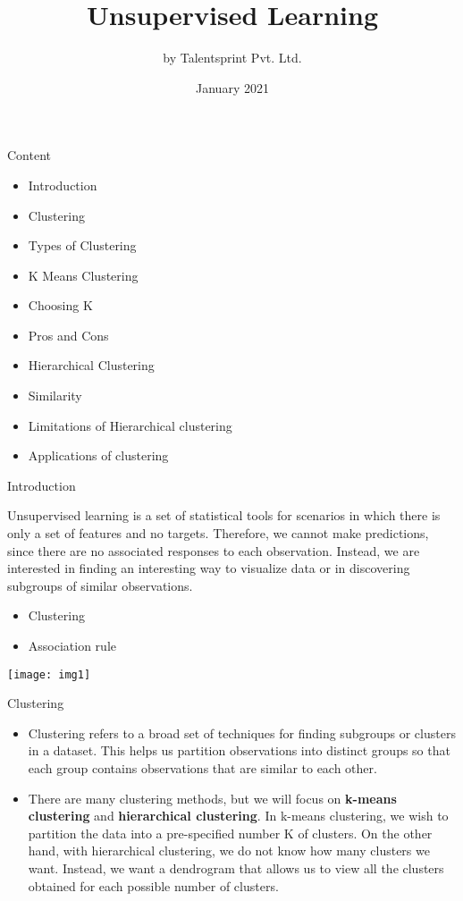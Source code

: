 \documentclass{beamer}
\title{Unsupervised Learning}
\author{by Talentsprint Pvt. Ltd.}
\date{January 2021}
\begin{document}
\maketitle
\begin{frame}{Content}
	\begin{itemize}
		\item Introduction
		\item Clustering
		\item Types of Clustering
		\item K Means Clustering
		\item Choosing K
		\item Pros and Cons
		\item Hierarchical Clustering
		\item Similarity
		\item Limitations of Hierarchical clustering
		\item Applications of clustering
	\end{itemize}
\end{frame}

\begin{frame}{Introduction}
	\begin{flushleft}
		Unsupervised learning is a set of statistical tools for scenarios in which there is only a set of features and no targets. Therefore, we cannot make predictions, since there are no associated responses to each observation. Instead, we are interested in finding an interesting way to visualize data or in discovering subgroups of similar observations.
		\begin{itemize}
			\item Clustering
			\item Association rule
		\end{itemize}
	\end{flushleft}
	\texttt{[image: img1]}
\end{frame}

\begin{frame}{Clustering}
\begin{flushleft}
\begin{itemize}
	\item Clustering refers to a broad set of techniques for finding subgroups or clusters in a dataset. This helps us partition observations into distinct groups so that each group contains observations that are similar to each other.
	\item There are many clustering methods, but we will focus on \textbf{k-means clustering} and \textbf{hierarchical clustering}. In k-means clustering, we wish to partition the data into a pre-specified number K of clusters. On the other hand, with hierarchical clustering, we do not know how many clusters we want. Instead, we want a dendrogram that allows us to view all the clusters obtained for each possible number of clusters.
\end{itemize}
\end{flushleft} 
\end{frame}
\end{document}
